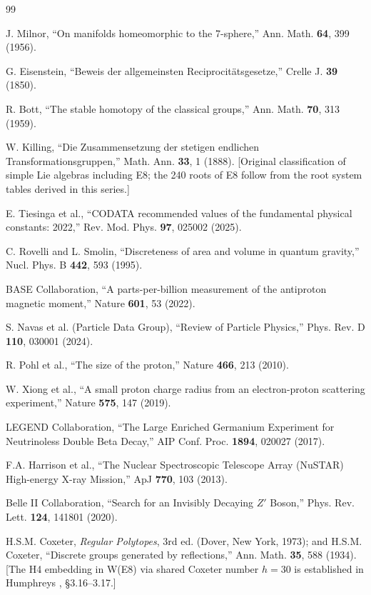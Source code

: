 \documentclass[aps,prd,twocolumn,superscriptaddress,floatfix,nofootinbib]{revtex4-2}
\theoremstyle{definition}
\theoremstyle{remark}
\begin{document}
\begin{thebibliography}{99}

 J. Milnor, ``On manifolds homeomorphic to the 7-sphere,'' Ann. Math. \textbf{64}, 399 (1956).

 G. Eisenstein, ``Beweis der allgemeinsten Reciprocit\"atsgesetze,'' Crelle J. \textbf{39} (1850).

 R. Bott, ``The stable homotopy of the classical groups,'' Ann. Math. \textbf{70}, 313 (1959).

 W. Killing, ``Die Zusammensetzung der stetigen endlichen Transformationsgruppen,'' Math. Ann. \textbf{33}, 1 (1888). [Original classification of simple Lie algebras including E8; the 240 roots of E8 follow from the root system tables derived in this series.]

 E. Tiesinga et al., ``CODATA recommended values of the fundamental physical constants: 2022,'' Rev. Mod. Phys. \textbf{97}, 025002 (2025).

 C. Rovelli and L. Smolin, ``Discreteness of area and volume in quantum gravity,'' Nucl. Phys. B \textbf{442}, 593 (1995).

 BASE Collaboration, ``A parts-per-billion measurement of the antiproton magnetic moment,'' Nature \textbf{601}, 53 (2022).

 S. Navas et al. (Particle Data Group), ``Review of Particle Physics,'' Phys. Rev. D \textbf{110}, 030001 (2024).

 R. Pohl et al., ``The size of the proton,'' Nature \textbf{466}, 213 (2010).

 W. Xiong et al., ``A small proton charge radius from an electron-proton scattering experiment,'' Nature \textbf{575}, 147 (2019).

 LEGEND Collaboration, ``The Large Enriched Germanium Experiment for Neutrinoless Double Beta Decay,'' AIP Conf. Proc. \textbf{1894}, 020027 (2017).

 F.A. Harrison et al., ``The Nuclear Spectroscopic Telescope Array (NuSTAR) High-energy X-ray Mission,'' ApJ \textbf{770}, 103 (2013).

 Belle II Collaboration, ``Search for an Invisibly Decaying $Z'$ Boson,'' Phys. Rev. Lett. \textbf{124}, 141801 (2020).

 H.S.M. Coxeter, \textit{Regular Polytopes}, 3rd ed. (Dover, New York, 1973); and H.S.M. Coxeter, ``Discrete groups generated by reflections,'' Ann. Math. \textbf{35}, 588 (1934). [The H4 embedding in W(E8) via shared Coxeter number $h=30$ is established in Humphreys \cite{humphreys}, \S3.16--3.17.]


\end{thebibliography}
\end{document}
